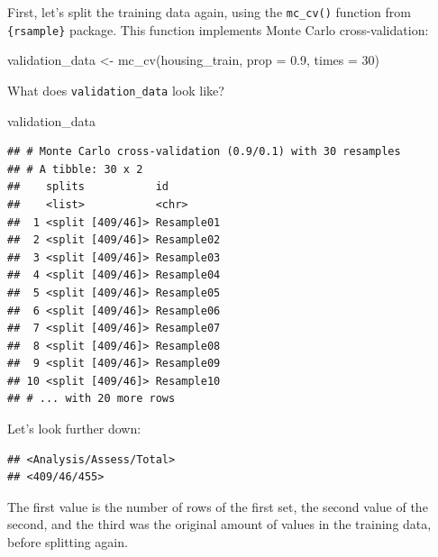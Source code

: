 \documentclass[
]{article}
\newenvironment{Shaded}{\begin{snugshade}}{\end{snugshade}}
\newcommand{\AttributeTok}[1]{\textcolor[rgb]{0.77,0.63,0.00}{#1}}
\newcommand{\DecValTok}[1]{\textcolor[rgb]{0.00,0.00,0.81}{#1}}
\newcommand{\FloatTok}[1]{\textcolor[rgb]{0.00,0.00,0.81}{#1}}
\newcommand{\FunctionTok}[1]{\textcolor[rgb]{0.00,0.00,0.00}{#1}}
\newcommand{\NormalTok}[1]{#1}
\newcommand{\OtherTok}[1]{\textcolor[rgb]{0.56,0.35,0.01}{#1}}
\newcommand{\SpecialCharTok}[1]{\textcolor[rgb]{0.00,0.00,0.00}{#1}}
\begin{document}
First, let's split the training data again, using the \texttt{mc\_cv()} function from \texttt{\{rsample\}} package.
This function implements Monte Carlo cross-validation:

\begin{Shaded}
\begin{Highlighting}[]
\NormalTok{validation\_data }\OtherTok{\textless{}{-}} \FunctionTok{mc\_cv}\NormalTok{(housing\_train, }\AttributeTok{prop =} \FloatTok{0.9}\NormalTok{, }\AttributeTok{times =} \DecValTok{30}\NormalTok{)}
\end{Highlighting}
\end{Shaded}

What does \texttt{validation\_data} look like?

\begin{Shaded}
\begin{Highlighting}[]
\NormalTok{validation\_data}
\end{Highlighting}
\end{Shaded}

\begin{verbatim}
## # Monte Carlo cross-validation (0.9/0.1) with 30 resamples  
## # A tibble: 30 x 2
##    splits           id        
##    <list>           <chr>     
##  1 <split [409/46]> Resample01
##  2 <split [409/46]> Resample02
##  3 <split [409/46]> Resample03
##  4 <split [409/46]> Resample04
##  5 <split [409/46]> Resample05
##  6 <split [409/46]> Resample06
##  7 <split [409/46]> Resample07
##  8 <split [409/46]> Resample08
##  9 <split [409/46]> Resample09
## 10 <split [409/46]> Resample10
## # ... with 20 more rows
\end{verbatim}

Let's look further down:

\begin{Shaded}
\end{Shaded}

\begin{verbatim}
## <Analysis/Assess/Total>
## <409/46/455>
\end{verbatim}

The first value is the number of rows of the first set, the second value of the second, and the third
was the original amount of values in the training data, before splitting again.
\end{document}
